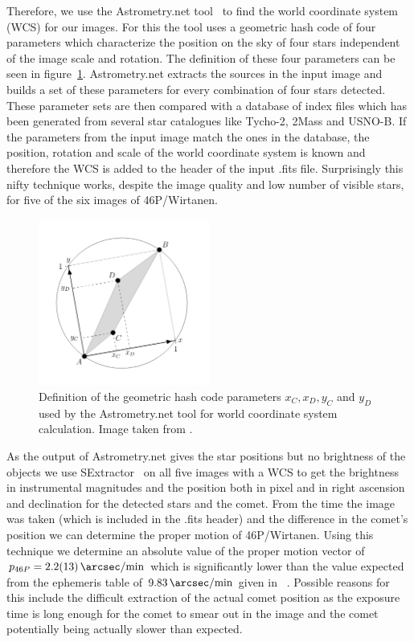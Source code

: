 \documentclass{article}
\begin{document}
Therefore, we use the Astrometry.net tool~\parencite{Astrometry} to find the world coordinate system (WCS) for our images. For this the tool uses a geometric hash code of four parameters which characterize the position on the sky of four stars independent of the image scale and rotation. The definition of these four parameters can be seen in figure~\ref{fig:quad}. Astrometry.net extracts the sources in the input image and builds a set of these parameters for every combination of four stars detected. These parameter sets are then compared with a database of index files which has been generated from several star catalogues like Tycho-2, 2Mass and USNO-B. If the parameters from the input image match the ones in the database, the position, rotation and scale of the world coordinate system is known and therefore the WCS is added to the header of the input .fits file. Surprisingly this nifty technique works, despite the image quality and low number of visible stars, for five of the six images of 46P/Wirtanen. 

\begin{figure}[H]
    \centering
    \includegraphics[width=0.5\textwidth]{Comet/quad.png}
    \caption{Definition of the geometric hash code parameters $x_C, x_D, y_C$ and $y_D$ used by the Astrometry.net tool for world coordinate system calculation. Image taken from \parencite{Astrometry}.}
    \label{fig:quad}
\end{figure}

As the output of Astrometry.net gives the star positions but no brightness of the objects we use SExtractor~\parencite{SExtractor} on all five images with a WCS to get the brightness in instrumental magnitudes and the position both in pixel and in right ascension and declination for the detected stars and the comet. From the time the image was taken (which is included in the .fits header) and the difference in the comet's position we can determine the proper motion of 46P/Wirtanen. Using this technique we determine an absolute value of the proper motion vector of $p_{46P} = \SI{2.2 \pm 1.3}{\arcsec \per \minute}$ which is significantly lower than the value expected from the ephemeris table of $\SI{9.83}{\arcsec \per \minute}$ given in ~\parencite{wirtanen}. Possible reasons for this include the difficult extraction of the actual comet position as the exposure time is long enough for the comet to smear out in the image and the comet potentially being actually slower than expected.
\end{document}
